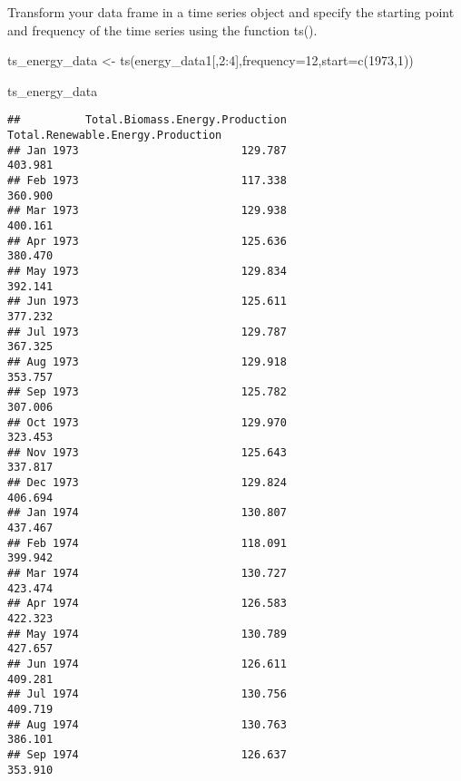 \documentclass[
]{article}
\newenvironment{Shaded}{\begin{snugshade}}{\end{snugshade}}
\newcommand{\AttributeTok}[1]{\textcolor[rgb]{0.77,0.63,0.00}{#1}}
\newcommand{\DecValTok}[1]{\textcolor[rgb]{0.00,0.00,0.81}{#1}}
\newcommand{\FunctionTok}[1]{\textcolor[rgb]{0.00,0.00,0.00}{#1}}
\newcommand{\NormalTok}[1]{#1}
\newcommand{\OtherTok}[1]{\textcolor[rgb]{0.56,0.35,0.01}{#1}}
\newcommand{\SpecialCharTok}[1]{\textcolor[rgb]{0.00,0.00,0.00}{#1}}
\begin{document}
Transform your data frame in a time series object and specify the
starting point and frequency of the time series using the function ts().

\begin{Shaded}
\begin{Highlighting}[]
\NormalTok{ts\_energy\_data }\OtherTok{\textless{}{-}} \FunctionTok{ts}\NormalTok{(energy\_data1[,}\DecValTok{2}\SpecialCharTok{:}\DecValTok{4}\NormalTok{],}\AttributeTok{frequency=}\DecValTok{12}\NormalTok{,}\AttributeTok{start=}\FunctionTok{c}\NormalTok{(}\DecValTok{1973}\NormalTok{,}\DecValTok{1}\NormalTok{))}

\NormalTok{ts\_energy\_data}
\end{Highlighting}
\end{Shaded}

\begin{verbatim}
##          Total.Biomass.Energy.Production Total.Renewable.Energy.Production
## Jan 1973                         129.787                           403.981
## Feb 1973                         117.338                           360.900
## Mar 1973                         129.938                           400.161
## Apr 1973                         125.636                           380.470
## May 1973                         129.834                           392.141
## Jun 1973                         125.611                           377.232
## Jul 1973                         129.787                           367.325
## Aug 1973                         129.918                           353.757
## Sep 1973                         125.782                           307.006
## Oct 1973                         129.970                           323.453
## Nov 1973                         125.643                           337.817
## Dec 1973                         129.824                           406.694
## Jan 1974                         130.807                           437.467
## Feb 1974                         118.091                           399.942
## Mar 1974                         130.727                           423.474
## Apr 1974                         126.583                           422.323
## May 1974                         130.789                           427.657
## Jun 1974                         126.611                           409.281
## Jul 1974                         130.756                           409.719
## Aug 1974                         130.763                           386.101
## Sep 1974                         126.637                           353.910

\end{verbatim}
\end{document}
